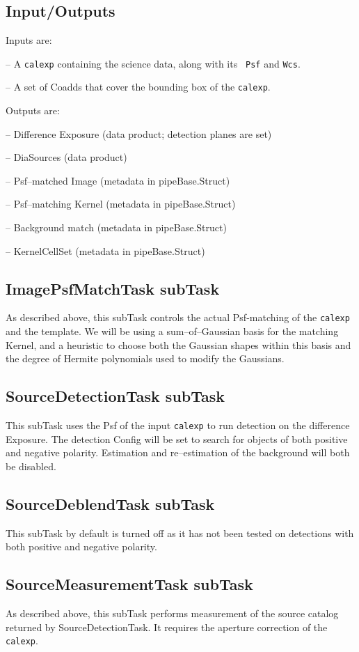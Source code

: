 \documentclass[prd, nofootinbib, floatfix, 11pt,tightenlines,times]{article}
\begin{document}
\subsection{Input/Outputs}

Inputs are:

-- A {\tt calexp} containing the science data, along with its {\tt
  Psf} and {\tt Wcs}.

-- A set of Coadds that cover the bounding box of the {\tt calexp}.

Outputs are:

-- Difference Exposure (data product; detection planes are set)

-- DiaSources (data product)

-- Psf--matched Image (metadata in pipeBase.Struct)

-- Psf--matching Kernel (metadata in pipeBase.Struct)

-- Background match (metadata in pipeBase.Struct)

-- KernelCellSet (metadata in pipeBase.Struct)

\subsection{ImagePsfMatchTask subTask}
As described above, this subTask controls the actual Psf-matching of
the {\tt calexp} and the template.  We will be using a
sum--of--Gaussian basis for the matching Kernel, and a heuristic to
choose both the Gaussian shapes within this basis and the degree of
Hermite polynomials used to modify the Gaussians.

\subsection{SourceDetectionTask subTask}
This subTask uses the Psf of the input {\tt calexp} to run detection
on the difference Exposure.  The detection Config will be set to
search for objects of both positive and negative polarity.  Estimation
and re--estimation of the background will both be disabled.

\subsection{SourceDeblendTask subTask}
This subTask by default is turned off as it has not been tested on detections
with both positive and negative polarity.

\subsection{SourceMeasurementTask subTask}
As described above, this subTask performs measurement of the source
catalog returned by SourceDetectionTask.  It requires the aperture
correction of the {\tt calexp}.
\end{document}
